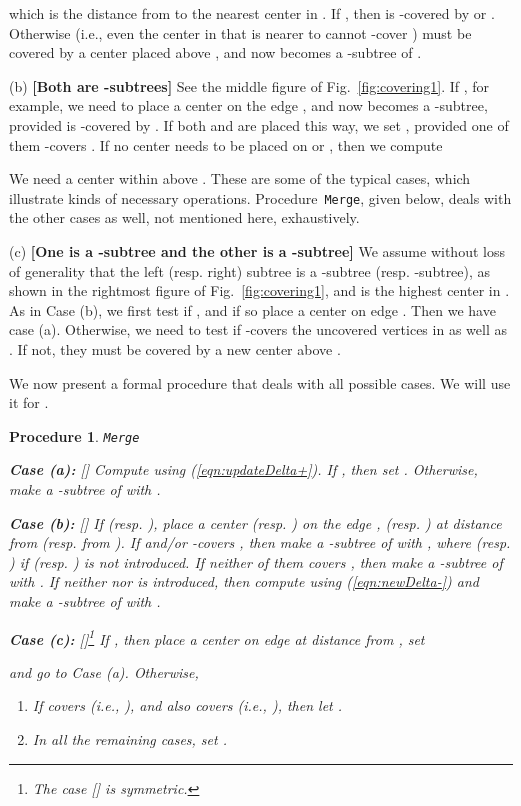 \documentclass{llncs}
\newtheorem{procedure}{Procedure}
\newcommand{\QED}{\hfill}
\begin{document}
{which is the distance from  to the nearest center in .
If ,
then  is -covered by  or . 
Otherwise (i.e., even the center in  that is nearer to  cannot -cover )
 must be covered by a center placed above ,
and  now becomes a -subtree of .

(b) {\bf [Both are -subtrees]} See the middle figure of  Fig.~\ref{fig:covering1}.
If ,
for example,
we need to place a center  on the edge , 
and  now becomes a -subtree,
provided  is -covered by .
If both  and  are placed this way,
we set ,
provided one of them -covers .
If no center needs to be placed on  or ,
then we compute

We need a center within  above .
These are some of the typical cases,
which illustrate kinds of necessary operations.
Procedure~{\tt Merge}, given below,
deals with the other cases as well, not mentioned here,
exhaustively.

(c) {\bf [One is a -subtree and the other is a -subtree]}
We assume without loss of generality that the left (resp. right) subtree is
a -subtree (resp. -subtree), as shown in the rightmost figure of  Fig.~\ref{fig:covering1},
and  is the highest center in .
As in Case (b),
we first test if ,
and if so place a center  on edge .
Then we have case (a).
Otherwise,
we need to test if  -covers the uncovered vertices in 
as well as .
If not, they must be covered by a new center above .

We now present a formal procedure that deals with all possible cases.
We will use it for .
\begin{procedure} {\tt Merge}\label{proc:merge}

\smallskip\noindent
{\bf Case (a):}
{\rm []}
Compute  using (\ref{eqn:updateDelta+}).
If ,
then set . 
Otherwise, make  a -subtree of  with .

\smallskip\noindent
{\bf Case (b):}
{\rm []}
If 
(resp. ),
place a center  (resp. )
on the edge , (resp. ) at distance  from 
(resp.   from ).
If  and/or  -covers ,
then make  a -subtree of  with
 ,
where  (resp. ) if
 (resp. ) is not introduced.
If neither of them covers ,
then make  a -subtree of  with .
If neither  nor  is introduced,
then compute  using (\ref{eqn:newDelta-})
and make  a -subtree of  with .


\smallskip\noindent
{\bf Case (c):}
{\rm []}\footnote{The case {\rm []}
 is symmetric.}
If ,
then place a center  on edge  at distance  from ,
set

and go to Case (a).
Otherwise,
\begin{enumerate}
\item[(i)]
If  covers  (i.e.,
),
and  also covers  (i.e.,
),
then  let .
\item[(ii)]
In all the remaining cases, set
.
\QED
\end{enumerate}
\end{procedure}

}
\end{document}
